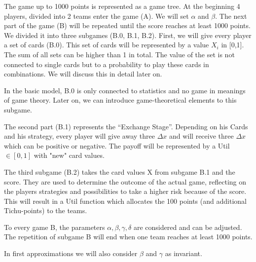 The game up to 1000 points is represented as a game tree.
At the beginning 4 players, divided into 2 teams enter the game (A). We will set $\alpha$ and $\beta$. 
The next part of the game (B) will be repeated until the score reaches at least 1000 points. We divided it into three subgames (B.0, B.1, B.2).
First, we will give every player a set of cards (B.0). This set of cards will be represented by a value $X_i$ in [0,1]. The sum of all sets can be higher than 1 in total. The value of the set is not connected to single cards but to a probability to play these cards in combinations. We will discuss this in detail later on.

In the basic model, B.0 is only connected to statistics and no game in meanings of game theory. Later on, we can introduce game-theoretical elements to this subgame. 

The second part (B.1) represents the “Exchange Stage”. Depending on his Cards and his strategy, every player will give away three $\Delta x$ and will receive three $\Delta x$ which can be positive or negative. The payoff will be represented by a Util$\in [0,1]$ with "new" card values.

The third subgame (B.2) takes the card values X from subgame B.1 and the score. They are used to determine the outcome of the actual game, reflecting on the players strategies and possibilities to take a higher risk because of the score. This will result in a Util function which allocates the 100 points (and additional Tichu-points) to the teams. 

To every game B, the parameters $\alpha, \beta, \gamma, \delta$ are considered and can be adjusted.  
The repetition of subgame B will end when one team reaches at least 1000 points. 

In first approximations we will also consider $\beta$ and $\gamma$ as invariant. 


